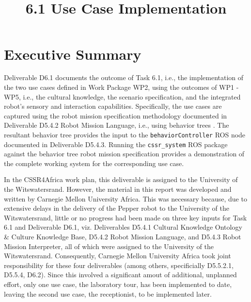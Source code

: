 \documentclass{CSSRforAfrica}
\begin{document}



\title{6.1  Use Case Implementation}   





\maketitle
 

\section*{Executive Summary}
\label{executive_summary}
 
Deliverable D6.1  documents the outcome of Task 6.1, i.e., the  implementation of the two  use cases defined in Work Package WP2, using the outcomes of WP1 - WP5, i.e., the cultural knowledge, the scenario specification, and the integrated  robot's sensory and interaction capabilities.
Specifically, the use cases are captured using the robot mission specification methodology documented in Deliverable D5.4.2 Robot Mission Language, i.e., using behavior trees \cite{Ghzoulietal2023,DortmansPunter2022}. The resultant behavior tree provides the input to the {\small \tt behaviorController} ROS node documented in Deliverable D5.4.3.  Running the {\small \tt cssr\_system} ROS package against the behavior tree robot mission specification provides a demonstration of the complete working system for the corresponding  use case. 

In the CSSR4Africa work plan, this deliverable is assigned to the University of the Witswatersrand. However, the material in this  report was developed and written by Carnegie Mellon University Africa. This was necessary because, due to extensive delays in the delivery of the Pepper robot to the University of the Witswatersrand, little or no progress had been made on three key inputs for Task 6.1 and Deliverable D6.1, viz. Deliverables D5.4.1 Cultural Knowledge Ontology \& Culture Knowledge Base, D5.4.2 Robot Mission Language, and D5.4.3 Robot Mission Interpreter, all of which were assigned to the University of the Witswatersrand.  Consequently,  Carnegie Mellon University Africa took joint responsibility for these four deliverables (among others, specificially D5.5.2.1, D5.5.4, D6.2). Since this involved a significant amout of additional, unplanned effort, only one use case, the laboratory tour,  has been implemented to date, leaving the second use case, the receptionist, to be implemented later.
  
\end{document}
